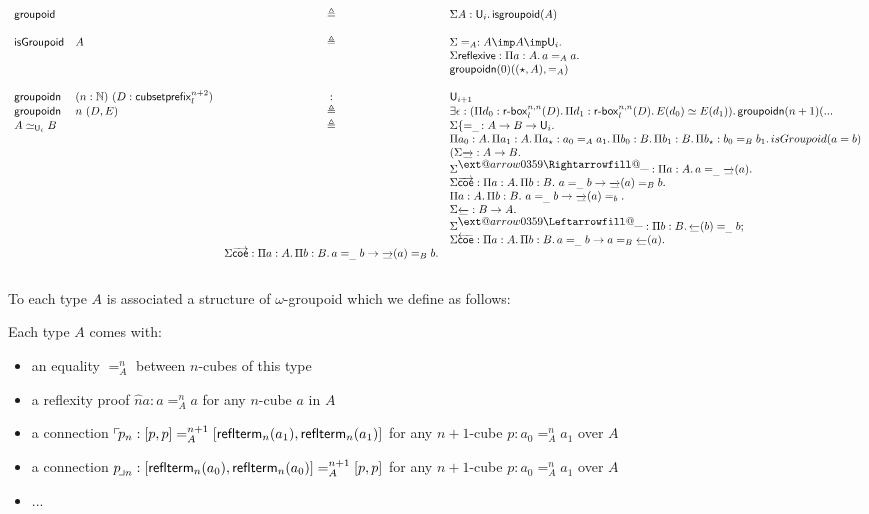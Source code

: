 \documentclass{article}
\makeatletter
\newcommand{\Overrightarrow}[2]{\raisebox{#1}{$\ext@arrow 0359\Rightarrowfill@{\mbox{${#2}$}}{}$}}
\newcommand{\Overleftarrow}[2]{\raisebox{#1}{$\ext@arrow 0359\Leftarrowfill@{\mbox{${#2}$}}{}$}}
\newcommand{\sort}[1]{\mathsf{U}_{#1}}
\newcommand{\reflterm}[1]{\widehat{#1}}
\newcommand{\defeq}{\triangleq}
\makeatother
\begin{document}
$$
\begin{array}{llcl}
\groupoid & & \defeq & \Sigma A:\sort{i}.\,\mathsf{isgroupoid}(A)\\
\\
\mathsf{isGroupoid} & A & \defeq & \Sigma =_A:A \imp A \imp \sort{i}.\,\\
& & & \Sigma \mathsf{reflexive} : \Pi a:A.\, a =_A a.\,\\
& & & \groupoidn(0)((\star,A),=_A)\\
\\
\groupoidn & (n:\mathbb{N})~(D:\partialcubset{l}^{n+2}) & : & \sort{i+1}\\
\groupoidn & n~(D,E) & \defeq & \exists \epsilon : (\Pi d_0 : \mybox{l}^{n,n}(D).\,\Pi d_1 : \mybox{l}^{n,n}(D).\, E(d_0) \simeq E(d_1)).\,\groupoidn(n+1)(...\\
A \simeq_{\sort{i}} B & & \defeq &
 \Sigma \{=_{\_}\, : A \rightarrow B \rightarrow \sort{i}.\,\\
& & & \Pi a_0:A.\, \Pi a_1:A.\, \Pi a_\star: a_0 =_A a_1.\, \Pi b_0:B.\, \Pi b_1:B.\, \Pi b_\star:b_0 =_B b_1.\, isGroupoid (a = b)\\
& & & (\Sigma \overrightarrow{\_} : A \rightarrow B.\,\\
& & & \Sigma \Overrightarrow{1ex}{\_} : \Pi a:A.\, a =_{\_} \overrightarrow{\_}(a).\,\\
& & & \Sigma \overrightarrow{\mathsf{coe}} : \Pi a:A.\,\Pi b:B.\,\, a =_{\_} b \rightarrow \overrightarrow{\_}(a) =_B b.\,\\
& & & \Pi a:A.\,\Pi b:B.\,\, a =_{\_} b \rightarrow \overrightarrow{\_}(a) =_ b.\,\\
& & & \Sigma \overleftarrow{\_} : B \rightarrow A.\,\\
& & & \Sigma \Overleftarrow{1ex}{\_} : \Pi b:B.\, \overleftarrow{\_}(b) =_{\_} b; \\
& & & \Sigma \overleftarrow{\mathsf{coe}} : \Pi a:A.\,\Pi b:B.\, a =_{\_} b \rightarrow a =_B \overleftarrow{\_}(a).\,\\
& & \Sigma \overrightarrow{\mathsf{coe}} : \Pi a:A.\,\Pi b:B.\, a =_{\_} b \rightarrow \overrightarrow{\_}(a) =_B b.\\
\\
\end{array}
$$

\fi

\iffalse
To each type $A$ is associated a structure of $\omega$-groupoid which
we define as follows:

Each type $A$ comes with:
\begin{itemize}
\item an equality $=^n_A$ between $n$-cubes of this type
\item a reflexity proof $\reflterm{n}{a} : a =^n_A a$ for any $n$-cube
  $a$ in $A$
\item a connection $\nwconn{n}{p} : [p,p] =^{n+1}_A [\refltermn{n}{A}{a_1},\refltermn{n}{A}{a_1}]$ for any $n+1$-cube $p:a_0 =^n_A a_1$ over $A$
\item a connection $\seconn{n}{p} : [\refltermn{n}{A}{a_0},\refltermn{n}{A}{a_0}] =^{n+1}_A [p,p]$ for any $n+1$-cube $p:a_0 =^n_A a_1$ over $A$
\item ...
\end{itemize}
\end{document}

